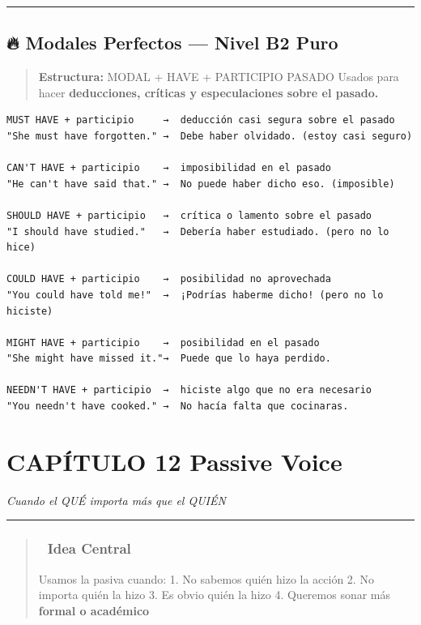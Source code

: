 \documentclass[
  spanish,
  letterpaper,
]{scrbook}
\begin{document}
\begin{center}\rule{0.5\linewidth}{0.5pt}\end{center}

\section{🔥 Modales Perfectos --- Nivel B2
Puro}\label{modales-perfectos-nivel-b2-puro}

\begin{quote}
\textbf{Estructura:} MODAL + HAVE + PARTICIPIO PASADO Usados para hacer
\textbf{deducciones, críticas y especulaciones sobre el pasado.}
\end{quote}

\begin{verbatim}
MUST HAVE + participio     →  deducción casi segura sobre el pasado
"She must have forgotten." →  Debe haber olvidado. (estoy casi seguro)

CAN'T HAVE + participio    →  imposibilidad en el pasado
"He can't have said that." →  No puede haber dicho eso. (imposible)

SHOULD HAVE + participio   →  crítica o lamento sobre el pasado
"I should have studied."   →  Debería haber estudiado. (pero no lo hice)

COULD HAVE + participio    →  posibilidad no aprovechada
"You could have told me!"  →  ¡Podrías haberme dicho! (pero no lo hiciste)

MIGHT HAVE + participio    →  posibilidad en el pasado
"She might have missed it."→  Puede que lo haya perdido.

NEEDN'T HAVE + participio  →  hiciste algo que no era necesario
"You needn't have cooked." →  No hacía falta que cocinaras.
\end{verbatim}

\chapter{CAPÍTULO 12 Passive Voice}\label{capuxedtulo-12-passive-voice}

\emph{Cuando el QUÉ importa más que el QUIÉN}

\begin{center}\rule{0.5\linewidth}{0.5pt}\end{center}

\begin{quote}
\subsection{🎯 Idea Central}\label{idea-central-10}

Usamos la pasiva cuando: 1. No sabemos quién hizo la acción 2. No
importa quién la hizo 3. Es obvio quién la hizo 4. Queremos sonar más
\textbf{formal o académico}
\end{quote}
\end{document}
